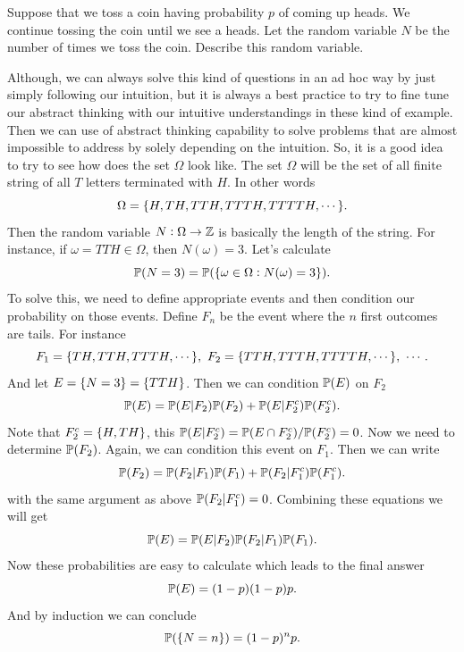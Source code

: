 \begin{example}
	Suppose that we toss a coin having probability $p$ of coming up heads. We continue tossing the coin until we see a heads. Let the random variable $N$ be the number of times we toss the coin. Describe this random variable.
	
	\begin{solution}
		Although, we can always solve this kind of questions in an ad hoc way by just simply following our intuition, but it is always a best practice to try to fine tune our abstract thinking with our intuitive understandings in these kind of example. Then we can use of abstract thinking capability to solve problems that are almost impossible to address by solely depending on the intuition. So, it is a good idea to try to see how does the set $\Omega$ look like. The set $\Omega$ will be the set of all finite string of all $T$ letters terminated with $H$. In other words
		\[ \Omega = \{H,TH, TTH, TTTH, TTTTH, \cdots\}. \]
		Then the random variable $N: \Omega \to \mathbb{Z}$ is basically the length of the string. For instance, if $\omega = TTH \in \Omega$, then $N(\omega) = 3$. Let's calculate
		\[ \mathbb{P}(N = 3) = \mathbb{P}(\{\omega \in \Omega: N(\omega) = 3\}). \]
		To solve this, we need to define appropriate events and then condition our probability on those events. Define $F_n$ be the event where the $n$ first outcomes are tails. For instance
		\[ F_1 = \set{TH, TTH, TTTH,\cdots},\ F_2 = \set{TTH, TTTH, TTTTH, \cdots},\ \cdots.\]
		And let $E = \{N=3\} = \{TTH\}$. Then we can condition $\mathbb{P}(E)$ on $F_2$ 
		\[ \mathbb{P}(E) = \mathbb{P}(E|F_2) \mathbb{P}(F_2) + \mathbb{P}(E|F_2^c) \mathbb{P}(F_2^c). \]
		Note that $F_2^c = \{H, TH\}$, this $\mathbb{P}(E|F_2^c) = \mathbb{P}(E \cap F_2^c)/\mathbb{P}(F_2^c) = 0$. Now we need to determine $\mathbb{P}(F_2)$. Again, we can condition this event on $F_1$. Then we can write
		\[ \mathbb{P}(F_2) = \mathbb{P}(F_2|F_1)\mathbb{P}(F_1) + \mathbb{P}(F_2|F_1^c) \mathbb{P}(F_1^c). \]
		with the same argument as above $\mathbb{P}(F_2|F_1^c) = 0$. Combining these equations we will get
		\[ \mathbb{P}(E) = \mathbb{P}(E|F_2) \mathbb{P}(F_2|F_1) \mathbb{P}(F_1). \]
		Now these probabilities are easy to calculate which leads to the final answer
		\[ \mathbb{P}(E) = (1-p)(1-p) p.  \]
		And by induction we can conclude
		\[ \mathbb{P}(\{N = n\}) = (1-p)^n p.  \]
	\end{solution}
\end{example}


